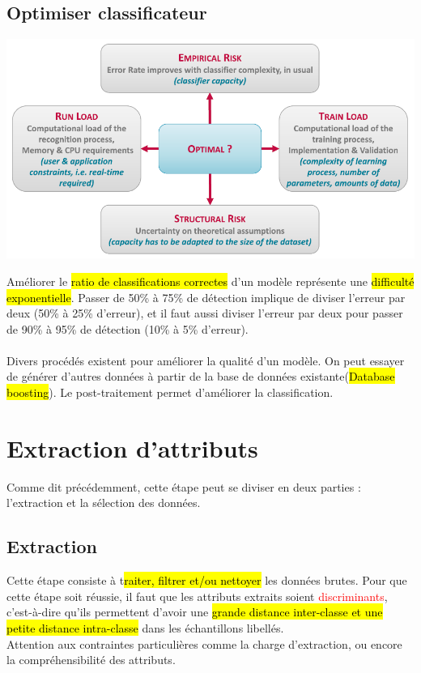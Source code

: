 \documentclass[letterpaper, 12pt]{article}
\newcommand{\alinea}{
\hspace*{0.5cm}}
\newcommand{\red}[1]{
	\textcolor{red}{#1}}
\begin{document}
		\subsection{Optimiser classificateur}
			\begin{center}
				\includegraphics[width=6.75in]{Images/quality} 
			\end{center}
			\alinea Améliorer le \hl{ratio de classifications correctes} d'un modèle représente une \hl{difficulté exponentielle}. 
				Passer de 50\% à 75\% de détection implique de diviser l'erreur par deux (50\% à 25\% d'erreur), et il faut aussi 
				diviser l'erreur par deux pour passer de 90\% à 95\% de détection (10\% à 5\% d'erreur).\\
			~\\
			\alinea Divers procédés existent pour améliorer la qualité d'un modèle. On peut essayer de générer d'autres données
				à partir de la base de données existante(\hl{Database boosting}). Le post-traitement permet d'améliorer la classification.
	\section{Extraction d'attributs}
		\alinea Comme dit précédemment, cette étape peut se diviser en deux parties : l'extraction et la sélection des données.
		\subsection{Extraction}
			\alinea Cette étape consiste à t\hl{raiter, filtrer et/ou nettoyer} les données brutes. Pour que cette étape soit réussie,
				il faut que les attributs extraits soient \red{discriminants}, c'est-à-dire qu'ils permettent d'avoir une 
				\hl{grande distance inter-classe et une petite distance intra-classe} dans les échantillons libellés.\\
			\alinea Attention aux contraintes particulières comme la charge d'extraction, ou encore la compréhensibilité des attributs.
\end{document}
